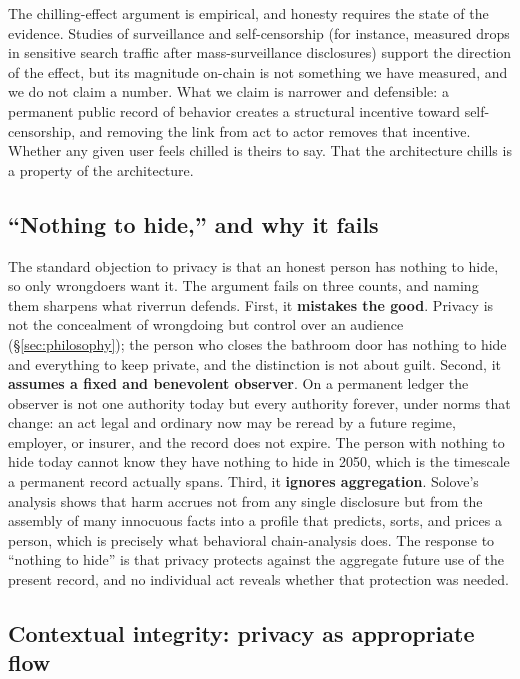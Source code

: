 \documentclass[11pt]{article}
\begin{document}
\begin{honest}
The chilling-effect argument is empirical, and honesty requires the state of the
evidence. Studies of surveillance and self-censorship (for instance, measured drops in
sensitive search traffic after mass-surveillance disclosures) support the direction of
the effect, but its magnitude on-chain is not something we have measured, and we do not
claim a number. What we claim is narrower and defensible: a permanent public record of
behavior creates a structural incentive toward self-censorship, and removing the link
from act to actor removes that incentive. Whether any given user feels chilled is
theirs to say. That the architecture chills is a property of the architecture.
\end{honest}

\subsection{``Nothing to hide,'' and why it fails}

The standard objection to privacy is that an honest person has nothing to hide, so only
wrongdoers want it. The argument fails on three counts, and naming them sharpens what
riverrun defends. First, it \textbf{mistakes the good}. Privacy is not the concealment of
wrongdoing but control over an audience (\S\ref{sec:philosophy}); the person who closes
the bathroom door has nothing to hide and everything to keep private, and the distinction
is not about guilt. Second, it \textbf{assumes a fixed and benevolent observer}. On a
permanent ledger the observer is not one authority today but every authority forever,
under norms that change: an act legal and ordinary now may be reread by a future regime,
employer, or insurer, and the record does not expire. The person with nothing to hide
today cannot know they have nothing to hide in 2050, which is the timescale a permanent
record actually spans. Third, it \textbf{ignores aggregation}. Solove's analysis
\cite{solove} shows that harm accrues not from any single disclosure but from the
assembly of many innocuous facts into a profile that predicts, sorts, and prices a person,
which is precisely what behavioral chain-analysis does. The response to ``nothing to
hide'' is that privacy protects against the aggregate future use of the present record,
and no individual act reveals whether that protection was needed.

\subsection{Contextual integrity: privacy as appropriate flow}
\end{document}
